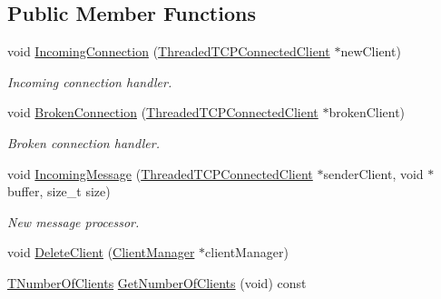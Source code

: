 \subsection*{Public Member Functions}
\begin{DoxyCompactItemize}
\item 
void \hyperlink{class_connection_manager_a54968c1176475aa513538691b75aedc9}{Incoming\-Connection} (\hyperlink{class_threaded_t_c_p_connected_client}{Threaded\-T\-C\-P\-Connected\-Client} $\ast$new\-Client)
\begin{DoxyCompactList}\small\item\em Incoming connection handler. \end{DoxyCompactList}\item 
void \hyperlink{class_connection_manager_a64473b0369ab91daf3a2da6b8ef576d0}{Broken\-Connection} (\hyperlink{class_threaded_t_c_p_connected_client}{Threaded\-T\-C\-P\-Connected\-Client} $\ast$broken\-Client)
\begin{DoxyCompactList}\small\item\em Broken connection handler. \end{DoxyCompactList}\item 
void \hyperlink{class_connection_manager_a4657b51054ad28143f1bddd1f5cc282c}{Incoming\-Message} (\hyperlink{class_threaded_t_c_p_connected_client}{Threaded\-T\-C\-P\-Connected\-Client} $\ast$sender\-Client, void $\ast$buffer, size\-\_\-t size)
\begin{DoxyCompactList}\small\item\em New message processor. \end{DoxyCompactList}\item 
void \hyperlink{class_connection_manager_afc67553cf1eff6ab251a5dd2a313e863}{Delete\-Client} (\hyperlink{class_client_manager}{Client\-Manager} $\ast$client\-Manager)
\item 
\hyperlink{class_connection_manager_a0f5f5b25b063cfebfac54b25cda131f7}{T\-Number\-Of\-Clients} \hyperlink{class_connection_manager_adf13721cde7ae4615aadbb5262f67274}{Get\-Number\-Of\-Clients} (void) const 
\end{DoxyCompactItemize}
